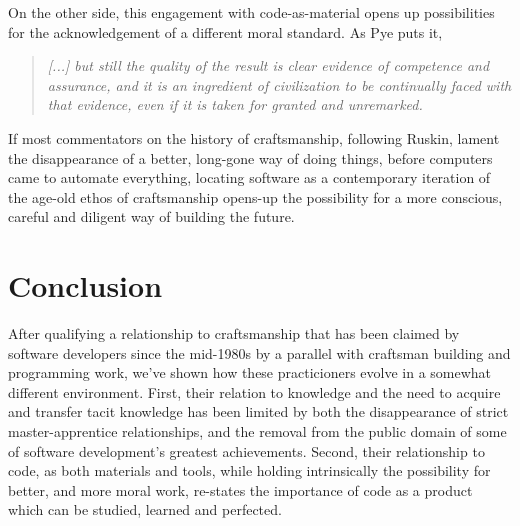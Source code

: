 \documentclass{article}
\begin{document}
On the other side, this engagement with code-as-material opens up possibilities for the acknowledgement of a different moral standard. As Pye puts it,

\begin{quote}
    \textit{[...] but still the quality of the result is clear evidence of competence and assurance, and it is an ingredient of civilization to be continually faced with that evidence, even if it is taken for granted and unremarked.\cite{pye_nature_2008}}
\end{quote}

If most commentators on the history of craftsmanship, following Ruskin, lament the disappearance of a better, long-gone way of doing things, before computers came to automate everything, locating software as a contemporary iteration of the age-old ethos of craftsmanship opens-up the possibility for a more conscious, careful and diligent way of building the future.

\section{Conclusion}

After qualifying a relationship to craftsmanship that has been claimed by software developers since the mid-1980s by a parallel with craftsman building and programming work, we've shown how these practicioners evolve in a somewhat different environment. First, their relation to knowledge and the need to acquire and transfer tacit knowledge has been limited by both the disappearance of strict master-apprentice relationships, and the removal from the public domain of some of software development's greatest achievements. Second, their relationship to code, as both materials and tools, while holding intrinsically the possibility for better, and more moral work, re-states the importance of code as a product which can be studied, learned and perfected.



\end{document}
